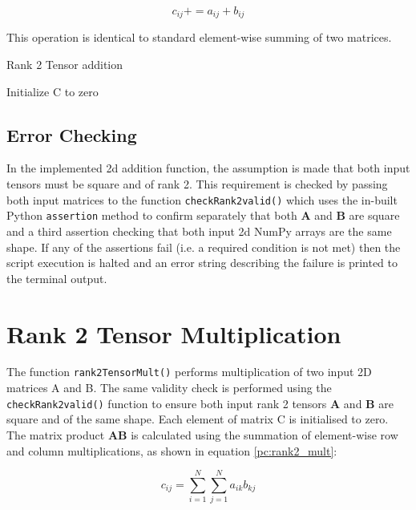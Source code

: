 \documentclass[10 pt, conference]{cssconf}
\begin{document}
\vspace{-10pt}
\begin{equation}\label{eq:sum_2d}
    c_{ij} \mathrel{{+}{=}}
     a_{ij} + b_{ij}
\end{equation}%

This operation is identical to standard element-wise summing of two matrices.
 
\begin{algorithm}[ht] \small
\caption{Rank 2 Tensor addition}\label{pc:rank2_add}
    	\SetAlgoLined
	Initialize C to zero\;
\end{algorithm}%

\subsection{Error Checking}
In the implemented 2d addition function, the assumption is made that both input tensors must be square and of rank 2. This requirement is checked by passing both input matrices to the function \verb|checkRank2valid()| which uses the in-built Python \verb|assertion| method to confirm separately that both $\mathbf{A}$ and $\mathbf{B}$ are square and a third assertion checking that both input 2d NumPy arrays are the same shape. If any of the assertions fail (i.e. a required condition is not met) then the script execution is halted and an error string describing the failure is printed to the terminal output.

\section{Rank 2 Tensor Multiplication}
The function \verb|rank2TensorMult()| performs multiplication of two input 2D matrices A and B. The same validity check is performed using the \verb|checkRank2valid()| function to ensure both input rank 2 tensors $\mathbf{A}$ and $\mathbf{B}$ are square and of the same shape.
Each element of matrix C is initialised to zero. The matrix product $\mathbf{AB}$ is calculated using the summation of element-wise row and column multiplications, as shown in equation \ref{pc:rank2_mult}:

\begin{equation}\label{eq:product_2d}
    c_{ij} \mathrel{{=}}
     \sum_{i=1}^{N}\sum_{j=1}^{N} a_{ik}b_{kj}
\end{equation}%
\end{document}

